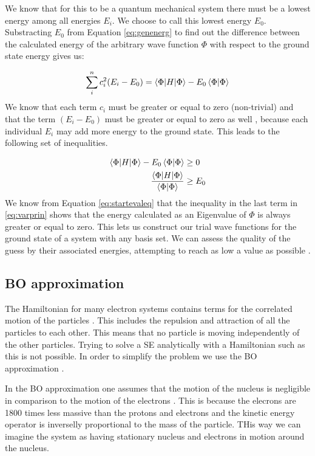 \documentclass[../master_thesis.tex]{subfiles}
\begin{document}
We know that for this to be a quantum mechanical system there must be a lowest
energy among all energies $E_i$. We choose to call this lowest energy $E_0$.
Substracting $E_0$ from Equation \ref{eq:genenerg} to find out the difference
between the calculated energy of the arbitrary wave function $\Phi$ with respect
to the ground state energy gives us:

\begin{equation}
   \sum\limits_i^nc_i^2(E_i - E_0) = \braket{\Phi | H | \Phi} -
   E_0\braket{\Phi | \Phi}
\end{equation}
We know that each term $c_i$ must be greater or equal to zero (non-trivial) and
that the term $(E_i - E_0)$ must be greater or equal to zero as well
\cite{Cramer:2004}, because each individual $E_i$ may add more energy to the
ground state. This leads to the following set of inequalities.

\begin{equation}
  \begin{split} \label{eq:varprin}
    \braket{\Phi | H | \Phi} - E_0\braket{\Phi | \Phi} & \geq 0 \\
    \frac{\braket{\Phi | H | \Phi}}{\braket{\Phi | \Phi}} & \geq E_0
  \end{split}
\end{equation}
We know from Equation \ref{eq:startevaleq} that the inequality in the last term in
\ref{eq:varprin} shows that the energy calculated as an Eigenvalue of $\Phi$ is
always greater or equal to zero. This lets us construct our trial wave functions
for the ground state of a system with any basis set. We can assess the quality
of the guess by their associated energies, attempting to reach as low a value
as possible \cite{Cramer:2004}.

\subsection{\ac{BO} approximation}

The Hamiltonian for many electron systems contains terms for the correlated
motion of the particles \cite{Cramer:2004, Jensen:2017}. This includes the
repulsion and attraction of all the particles to each other. This means that no
particle is moving independently of the other particles. Trying to solve a
\ac{SE} analytically with a Hamiltonian such as this is not possible. In order
to simplify the problem we use the \ac{BO} approximation \cite{Cramer:2004,
Jensen:2017}.

In the \ac{BO} approximation one assumes that the motion of the nucleus is
negligible in comparison to the motion of the electrons \cite{Cramer:2004,
Jensen:2017}. This is because the elecrons are 1800 times less massive than the
protons and electrons and the kinetic energy operator is inverselly
proportional to the mass of the particle. THis way we can imagine the system as
having stationary nucleus and electrons in motion around the nucleus.
\end{document}
